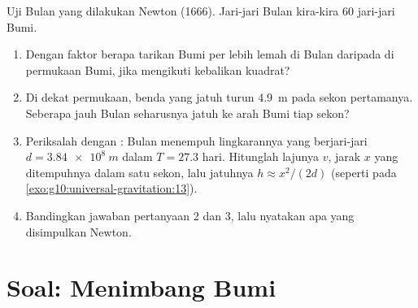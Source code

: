 \begin{exercise}[$\star\star\star$]\label{exo:g10:universal-gravitation:15}
Uji Bulan yang dilakukan Newton (1666). Jari-jari  Bulan kira-kira
$60$ jari-jari Bumi.
\begin{enumerate}
  \item Dengan faktor berapa tarikan Bumi per  lebih lemah di
        Bulan daripada di permukaan Bumi, jika  mengikuti
        kebalikan kuadrat?
  \item Di dekat permukaan, benda yang jatuh turun \qty{4.9}{m} pada
        sekon pertamanya. Seberapa jauh Bulan seharusnya jatuh ke arah
        Bumi tiap sekon?
  \item Periksalah dengan : Bulan menempuh lingkarannya yang
        berjari-jari $d = \qty{3.84e8}{m}$ dalam $T = 27.3$ hari.
        Hitunglah lajunya $v$, jarak $x$ yang ditempuhnya dalam satu
        sekon, lalu jatuhnya $h \approx x^2/(2d)$ (seperti pada
        \cref{exo:g10:universal-gravitation:13}).
  \item Bandingkan jawaban pertanyaan 2 dan 3, lalu nyatakan apa yang
        disimpulkan Newton.
\end{enumerate}
\end{exercise}

\section{Soal: Menimbang Bumi}

